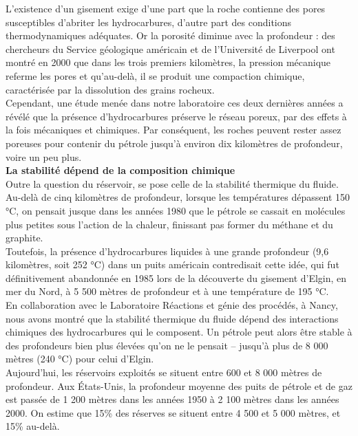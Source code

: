\documentclass[8pt]{article}
\begin{document}
L'existence d'un gisement exige d'une part que la roche contienne des pores susceptibles d'abriter les hydrocarbures, d'autre part des conditions thermodynamiques adéquates. Or la porosité diminue avec la profondeur : des chercheurs du Service géologique américain et de l'Université de Liverpool ont montré en 2000 que dans les trois premiers kilomètres, la pression mécanique referme les pores et qu'au-delà, il se produit une compaction chimique, caractérisée par la dissolution des grains rocheux. \\

Cependant, une étude menée dans notre laboratoire ces deux dernières années a révélé que la présence d'hydrocarbures préserve le réseau poreux, par des effets à la fois mécaniques et chimiques. Par conséquent, les roches peuvent rester assez poreuses pour contenir du pétrole jusqu'à environ dix kilomètres de profondeur, voire un peu plus.\\
 
\textbf{La stabilité dépend de la composition chimique}\\

Outre la question du réservoir, se pose celle de la stabilité thermique du fluide. Au-delà de cinq kilomètres de profondeur, lorsque les températures dépassent 150 °C, on pensait jusque dans les années 1980 que le pétrole se cassait en molécules plus petites sous l'action de la chaleur, finissant pas former du méthane et du graphite. \\

Toutefois, la présence d'hydrocarbures liquides à une grande profondeur (9,6 kilomètres, soit 252 °C) dans un puits américain contredisait cette idée, qui fut définitivement abandonnée en 1985 lors de la découverte du gisement d'Elgin, en mer du Nord, à 5 500 mètres de profondeur et à une température de 195 °C. \\

En collaboration avec le Laboratoire Réactions et génie des procédés, à Nancy, nous avons montré que la stabilité thermique du fluide dépend des interactions chimiques des hydrocarbures qui le composent. Un pétrole peut alors être stable à des profondeurs bien plus élevées qu'on ne le pensait – jusqu'à plus de 8 000 mètres (240 °C) pour celui d'Elgin. \\

Aujourd'hui, les réservoirs exploités se situent entre 600 et 8 000 mètres de profondeur. Aux États-Unis, la profondeur moyenne des puits de pétrole et de gaz est passée de 1 200 mètres dans les années 1950 à 2 100 mètres dans les années 2000. On estime que 15\% des réserves se situent entre 4 500 et 5 000 mètres, et 15\% au-delà.\\
\end{document}
